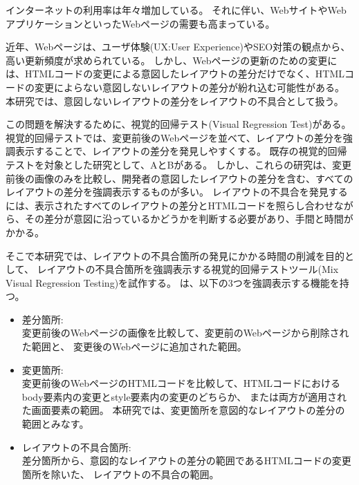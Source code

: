インターネットの利用率は年々増加している\cite{Soumusyou}。
それに伴い、WebサイトやWebアプリケーションといったWebページの需要も高まっている。
\par
近年、Webページは、ユーザ体験(UX:User Experience)やSEO対策の観点から、高い更新頻度が求められている\cite{SEO}。
しかし、Webページの更新のための変更には、HTMLコードの変更による意図したレイアウトの差分だけでなく、HTMLコードの変更によらない意図しないレイアウトの差分が紛れ込む可能性がある。
本研究では、意図しないレイアウトの差分をレイアウトの不具合として扱う。
\par
この問題を解決するために、視覚的回帰テスト(Visual Regression Test)\cite{VisualRegressionTesting}がある。
視覚的回帰テストでは、変更前後のWebページを並べて、レイアウトの差分を強調表示することで、レイアウトの差分を発見しやすくする。
既存の視覚的回帰テストを対象とした研究として、A\cite{RegionDetect}とB\cite{GuiRetrExternal}がある。
しかし、これらの研究は、変更前後の画像のみを比較し、開発者の意図したレイアウトの差分を含む、すべてのレイアウトの差分を強調表示するものが多い。
レイアウトの不具合を発見するには、表示されたすべてのレイアウトの差分とHTMLコードを照らし合わせながら、その差分が意図に沿っているかどうかを判断する必要があり、手間と時間がかかる。
\par
そこで本研究では、レイアウトの不具合箇所の発見にかかる時間の削減を目的として、
レイアウトの不具合箇所を強調表示する視覚的回帰テストツール\toolName(Mix Visual Regression Testing)を試作する。
\toolName は、以下の3つを強調表示する機能を持つ。
\begin{itemize}
      \item 差分箇所:\\
            変更前後のWebページの画像を比較して、変更前のWebページから削除された範囲と、
            変更後のWebページに追加された範囲。
      \item 変更箇所:\\
            変更前後のWebページのHTMLコードを比較して、HTMLコードにおけるbody要素内の変更とstyle要素内の変更のどちらか、
            または両方が適用された画面要素の範囲。
            本研究では、変更箇所を意図的なレイアウトの差分の範囲とみなす。
      \item レイアウトの不具合箇所:\\
            差分箇所から、意図的なレイアウトの差分の範囲であるHTMLコードの変更箇所を除いた、
            レイアウトの不具合の範囲。
\end{itemize}

